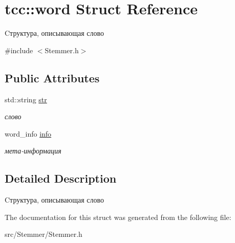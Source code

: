 \hypertarget{structtcc_1_1word}{}\section{tcc\+:\+:word Struct Reference}
\label{structtcc_1_1word}


Cтруктура, описывающая слово  




{\ttfamily \#include $<$Stemmer.\+h$>$}

\subsection*{Public Attributes}
\begin{DoxyCompactItemize}
\item 
std\+::string \hyperlink{structtcc_1_1word_a1e58166edd7841ebf5716836ae03554b}{str}\hypertarget{structtcc_1_1word_a1e58166edd7841ebf5716836ae03554b}{}\label{structtcc_1_1word_a1e58166edd7841ebf5716836ae03554b}

\begin{DoxyCompactList}\small\item\em слово \end{DoxyCompactList}\item 
word\+\_\+info \hyperlink{structtcc_1_1word_ae710e6c1eab9ef5d17444aa7549162c7}{info}\hypertarget{structtcc_1_1word_ae710e6c1eab9ef5d17444aa7549162c7}{}\label{structtcc_1_1word_ae710e6c1eab9ef5d17444aa7549162c7}

\begin{DoxyCompactList}\small\item\em мета-\/информация \end{DoxyCompactList}\end{DoxyCompactItemize}


\subsection{Detailed Description}
Cтруктура, описывающая слово 

The documentation for this struct was generated from the following file\+:\begin{DoxyCompactItemize}
\item 
src/\+Stemmer/Stemmer.\+h\end{DoxyCompactItemize}
